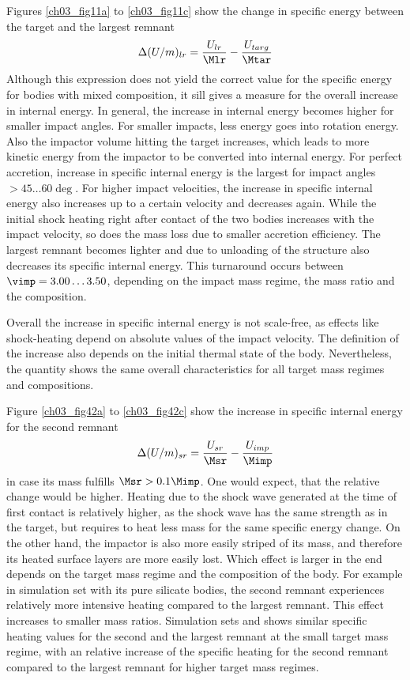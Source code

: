 Figures \ref{ch03_fig11a} to \ref{ch03_fig11c} show the change in specific energy between the target and the largest remnant 
\begin{align}
\Delta (U / m )_{lr} = \frac{U_{lr}}{\Mlr} - \frac{U_{targ}}{\Mtar} 
\end{align}
Although this expression does not yield the correct value for the specific energy for bodies with mixed composition, it sill gives a measure for the overall increase in internal energy. In general, the increase in internal energy becomes higher for smaller impact angles. For smaller impacts, less energy goes into rotation energy. Also the impactor volume hitting the target increases, which leads to more kinetic energy from the impactor to be converted into internal energy. For perfect accretion, increase in specific internal energy is the largest for impact angles $> 45 \dots 60 \deg$. For higher impact velocities, the increase in specific internal energy also increases up to a certain velocity and decreases again. While the initial shock heating right after contact of the two bodies increases with the impact velocity, so does the mass loss due to smaller accretion efficiency. The largest remnant becomes lighter and due to unloading of the structure also decreases its specific internal energy. This turnaround occurs between $\vimp = 3.00 \dots 3.50$, depending on the impact mass regime, the mass ratio and the composition.

Overall the increase in specific internal energy is not scale-free, as effects like shock-heating depend on absolute values of the impact velocity. The definition of the increase also depends on the initial thermal state of the body. Nevertheless, the quantity shows the same overall characteristics for all target mass regimes and compositions.

Figure \ref{ch03_fig42a} to \ref{ch03_fig42c} show the increase in specific internal energy for the second remnant
\begin{align}
\Delta (U / m )_{sr} = \frac{U_{sr}}{\Msr} - \frac{U_{imp}}{\Mimp} 
\end{align}
in case its mass fulfills $\Msr  > 0.1 \Mimp$. One would expect, that the relative change would be higher. Heating due to the shock wave generated at the time of first contact is relatively higher, as the shock wave has the same strength as in the target, but requires to heat less mass for the same specific energy change. On the other hand, the impactor is also more easily striped of its mass, and therefore its heated surface layers are more easily lost. Which effect is larger in the end depends on the target mass regime and the composition of the body. For example in simulation set \rss with its pure silicate bodies, the second remnant experiences relatively more intensive heating compared to the largest remnant. This effect increases to smaller mass ratios. Simulation sets \css and \iss shows similar specific heating values for the second and the largest remnant at the small target mass regime, with an relative increase of the specific heating for the second remnant compared to the largest remnant for higher target mass regimes.

